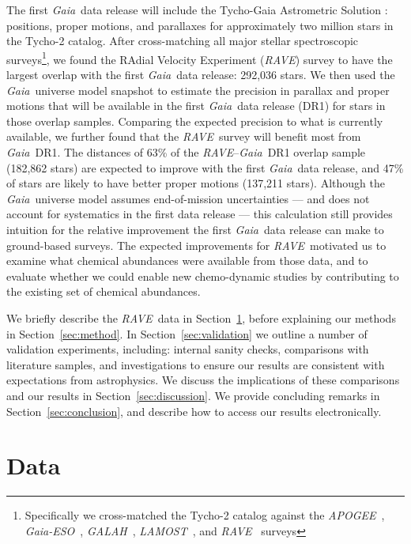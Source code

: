 \documentclass[preprint,trackchanges]{aastex}
\newcommand{\acronym}[1]{{\small{#1}}}
\newcommand{\project}[1]{\textsl{#1}}
\newcommand{\gaia}{\project{Gaia}}
\newcommand{\rave}{\project{\acronym{RAVE}}}
\newcommand{\galah}{\project{\acronym{GALAH}}}
\newcommand{\ges}{\project{Gaia-ESO}}
\newcommand{\apogee}{\project{\acronym{APOGEE}}}
\newcommand{\lamost}{\project{\acronym{LAMOST}}}
\newcommand{\tgas}{\project{\acronym{TGAS}}}
\begin{document}
The first \gaia\ data release will include the Tycho-Gaia Astrometric Solution
\citep[hereafter \tgas;][]{Michalik_2015a,Michalik_2015b}: positions, proper 
motions, and parallaxes for approximately two million stars in the Tycho-2 
\citep{Hog_2000} catalog.  After cross-matching all major stellar spectroscopic 
surveys\footnote{Specifically we cross-matched the Tycho-2 catalog against the 
\apogee\ \citep{Zasowski_2013}, \ges\ \citep{Gilmore_2012,Randich_2013}, 
\galah\ \citep{DeSilva_2015}, \lamost\ \citep{Cui_2012}, and \rave\ 
\citep{Steinmetz_2006} surveys}, we found the RAdial Velocity Experiment 
(\rave) survey to have the largest overlap with the first \gaia\ data release: 
292,036 stars.  We then used the \gaia\ universe model snapshot 
\citep{Robin_2012} to estimate the precision in parallax and proper motions that
will be available in the first \gaia\ data release (DR1) for stars in those 
overlap samples.  Comparing the expected precision to what is currently available, 
we further found that the \rave\ survey will benefit most from \gaia\ DR1.  The 
distances of 63\% of the \rave--\gaia\ DR1 overlap sample (182,862 stars) are 
expected to improve with the first \gaia\ data release, and 47\% of stars are 
likely to have better proper motions (137,211 stars).  Although the \gaia\ universe
model assumes end-of-mission uncertainties --- and does not account for systematics
in the first data release --- this calculation still provides intuition for the 
relative improvement the first \gaia\ data release can make to ground-based surveys.  
The expected improvements for \rave\ motivated us to examine what chemical abundances
were available from those data, and to evaluate whether we could enable new 
chemo-dynamic studies by contributing to the existing set of chemical abundances.


We briefly describe the \rave\ data in Section~\ref{sec:data}, before explaining
our methods in Section~\ref{sec:method}.  In Section~\ref{sec:validation}
we outline a number of validation experiments, including: internal sanity checks,
comparisons with literature samples, and investigations to ensure our results
are consistent with expectations from astrophysics.  We discuss the implications
of these comparisons and our results in Section~\ref{sec:discussion}.  We provide
concluding remarks in Section~\ref{sec:conclusion}, and describe how to access our
results electronically.


\section{Data}
\label{sec:data}
\end{document}
